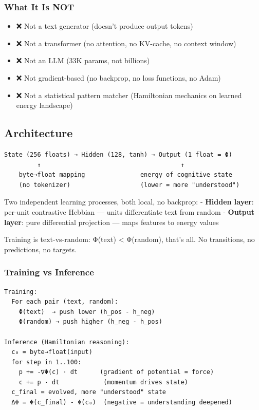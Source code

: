\documentclass[
  11pt,
  a4paper,
]{article}
\providecommand{\tightlist}{%
  \setlength{\itemsep}{0pt}\setlength{\parskip}{0pt}}
\begin{document}
\subsubsection{What It Is NOT}\label{what-it-is-not}

\begin{itemize}
\tightlist
\item
  ❌ Not a text generator (doesn't produce output tokens)
\item
  ❌ Not a transformer (no attention, no KV-cache, no context window)
\item
  ❌ Not an LLM (33K params, not billions)
\item
  ❌ Not gradient-based (no backprop, no loss functions, no Adam)
\item
  ❌ Not a statistical pattern matcher (Hamiltonian mechanics on learned
  energy landscape)
\end{itemize}

\subsection{Architecture}\label{architecture}

\begin{verbatim}
State (256 floats) → Hidden (128, tanh) → Output (1 float = Φ)
         ↑                                      ↑
    byte→float mapping               energy of cognitive state
    (no tokenizer)                   (lower = more "understood")
\end{verbatim}

Two independent learning processes, both local, no backprop: -
\textbf{Hidden layer}: per-unit contrastive Hebbian --- units
differentiate text from random - \textbf{Output layer}: pure
differential projection --- maps features to energy values

Training is text-vs-random: Φ(text) \textless{} Φ(random), that's all.
No transitions, no predictions, no targets.

\subsubsection{Training vs Inference}\label{training-vs-inference}

\begin{verbatim}
Training:
  For each pair (text, random):
    Φ(text)  → push lower (h_pos - h_neg)
    Φ(random) → push higher (h_neg - h_pos)

Inference (Hamiltonian reasoning):
  c₀ = byte→float(input)
  for step in 1..100:
    p += -∇Φ(c) · dt      (gradient of potential = force)
    c += p · dt            (momentum drives state)
  c_final = evolved, more "understood" state
  ΔΦ = Φ(c_final) - Φ(c₀)  (negative = understanding deepened)
\end{verbatim}
\end{document}
